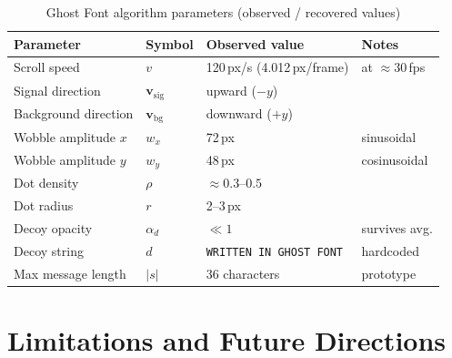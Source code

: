 \documentclass[12pt,a4paper]{article}
\begin{document}
\begin{table}[h!]
\centering
\caption{Ghost Font algorithm parameters (observed / recovered values)}
\label{tab:params}
\renewcommand{\arraystretch}{1.2}
\begin{tabular}{llll}
\toprule
\textbf{Parameter} & \textbf{Symbol} & \textbf{Observed value} & \textbf{Notes} \\
\midrule
Scroll speed           & $v$                          & 120\,px/s (4.012\,px/frame) & at $\approx$30\,fps \\
Signal direction       & $\mathbf{v}_{\mathrm{sig}}$  & upward ($-y$)               & \\
Background direction   & $\mathbf{v}_{\mathrm{bg}}$   & downward ($+y$)             & \\
Wobble amplitude $x$   & $w_x$                        & 72\,px                      & sinusoidal \\
Wobble amplitude $y$   & $w_y$                        & 48\,px                      & cosinusoidal \\
Dot density            & $\rho$                       & $\approx 0.3$--$0.5$        & \\
Dot radius             & $r$                          & 2--3\,px                    & \\
Decoy opacity          & $\alpha_d$                   & $\ll 1$                     & survives avg. \\
Decoy string           & $d$                          & \texttt{WRITTEN IN GHOST FONT} & hardcoded \\
Max message length     & $|s|$                        & 36 characters               & prototype \\
\bottomrule
\end{tabular}
\end{table}

\section{Limitations and Future Directions}
\end{document}
